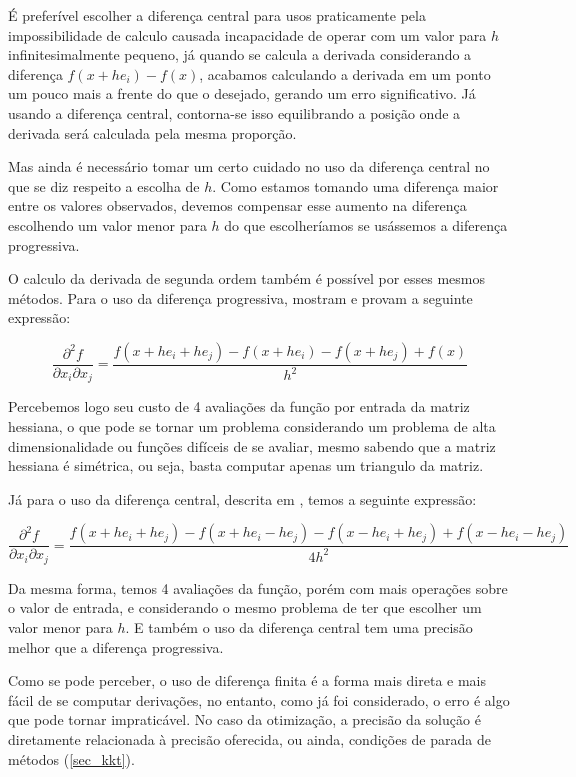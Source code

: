 É preferível escolher a diferença central para usos praticamente pela impossibilidade de
calculo causada incapacidade de operar com um valor para \(h\) infinitesimalmente pequeno, já
quando se calcula a derivada considerando a diferença \(f(x+he_i) - f(x)\), acabamos
calculando a derivada em um ponto um pouco mais a frente do que o desejado, gerando um erro
significativo. Já usando a diferença central, contorna-se isso equilibrando a posição onde a
derivada será calculada pela mesma proporção.

Mas ainda é necessário tomar um certo cuidado no uso da diferença central no que se diz
respeito a escolha de \(h\). Como estamos tomando uma diferença maior entre os valores
observados, devemos compensar esse aumento na diferença escolhendo um valor menor para \(h\)
do que escolheríamos se usássemos a diferença progressiva.

O calculo da derivada de segunda ordem também é possível por esses mesmos métodos.
Para o uso da diferença progressiva, \cite{dennisschnabel1996} mostram e provam a seguinte
expressão:

\begin{equation}
\frac{\partial^2 f}{\partial x_i \partial x_j} = \frac{f(x+he_i + he_j) - f(x+he_i) - f(x+he_j) + f(x)}{h^2}
\end{equation}

Percebemos logo seu custo de 4 avaliações da função por entrada da matriz hessiana, o que pode
se tornar um problema considerando um problema de alta dimensionalidade ou funções difíceis de
se avaliar, mesmo sabendo que a matriz hessiana é simétrica, ou seja, basta computar apenas um
triangulo da matriz.

Já para o uso da diferença central, descrita em \cite{abramowitz1972handbook}, temos a seguinte
expressão:

\begin{equation}
\frac{\partial^2 f}{\partial x_i \partial x_j} = \frac{f(x + he_i + he_j) - f(x + he_i - he_j) - f(x -he_i + he_j) + f(x - he_i -he_j )}{4h^2}
\end{equation}

Da mesma forma, temos 4 avaliações da função, porém com mais operações sobre o valor de entrada,
e considerando o mesmo problema de ter que escolher um valor menor para \(h\). E também o uso da
diferença central tem uma precisão melhor que a diferença progressiva.

Como se pode perceber, o uso de diferença finita é a forma mais direta e mais fácil de se
computar derivações, no entanto, como já foi considerado, o erro é algo que pode tornar
impraticável. No caso da otimização, a precisão da solução é diretamente relacionada à
precisão oferecida, ou ainda, condições de parada de métodos (\ref{sec_kkt}).

